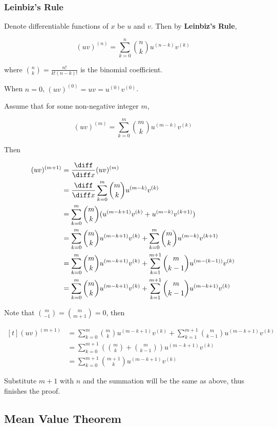 \subsubsection{Leinbiz's Rule}
\begin{thm}
  Denote differentiable functions of $x$ be $u$ and $v$. Then by \textbf{Leinbiz's Rule},

  $$(uv)^{(n)}=\sum_{k=0}^{n}\binom{n}{k}u^{(n-k)}v^{(k)}$$\s

  where $\binom{n}{k}=\frac{n!}{k!(n-k)!}$ is the binomial coefficient.\n

  \prf When $n=0$, $(uv)^{(0)}=uv=u^{(0)}v^{(0)}$.\n

  Assume that for some non-negative integer $m$,

  $$(uv)^{(m)}=\sum_{k=0}^{m}\binom{m}{k}u^{(m-k)}v^{(k)}$$\s

  Then

  $$\begin{aligned}[t]
    (uv)^{(m+1)}&=\frac{\diff }{\diff  x}(uv)^{(m)}\\
    &=\frac{\diff }{\diff  x}\sum_{k=0}^{m}\binom{m}{k}u^{(m-k)}v^{(k)}\\
    &=\sum_{k=0}^{m}\binom{m}{k}(u^{(m-k+1)}v^{(k)}+u^{(m-k)}v^{(k+1)})\\
    &=\sum_{k=0}^{m}\binom{m}{k}u^{(m-k+1)}v^{(k)}+\sum_{k=0}^{m}\binom{m}{k}u^{(m-k)}v^{(k+1)}\\
    &=\sum_{k=0}^{m}\binom{m}{k}u^{(m-k+1)}v^{(k)}+\sum_{k=1}^{m+1}\binom{m}{k-1}u^{(m-(k-1))}v^{(k)}\\
    &=\sum_{k=0}^{m}\binom{m}{k}u^{(m-k+1)}v^{(k)}+\sum_{k=1}^{m+1}\binom{m}{k-1}u^{(m-k+1)}v^{(k)}
  \end{aligned}$$\s

  Note that $\binom{m}{-1}=\binom{m}{m+1}=0$, then

  $$\begin{aligned}[t]
    (uv)^{(m+1)}&=\sum_{k=0}^{m}\binom{m}{k}u^{(m-k+1)}v^{(k)}+\sum_{k=1}^{m+1}\binom{m}{k-1}u^{(m-k+1)}v^{(k)}\\
    &=\sum_{k=0}^{m+1}\left( \binom{m}{k}+\binom{m}{k-1}\right) u^{(m-k+1)}v^{(k)}\\
    &=\sum_{k=0}^{m+1}\binom{m+1}{k}u^{(m-k+1)}v^{(k)}
  \end{aligned}$$\s

  Substitute $m+1$ with $n$ and the summation will be the same as above, thus finishes the proof.
\end{thm}

\subsection{Mean Value Theorem}
